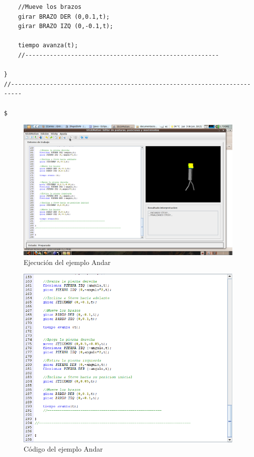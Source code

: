 \documentclass[a4paper, 12pt]{book}
\begin{document}
\begin{itemize}
\begin{verbatim}
    //Mueve los brazos
    girar BRAZO DER (0,0.1,t);
    girar BRAZO IZQ (0,-0.1,t);

    tiempo avanza(t);
    //-------------------------------------------------------

}
//-------------------------------------------------------------------------

$
\end{verbatim}
  
  
  
  
\begin{figure}[htb]
  \centerline{\includegraphics[width=\textwidth]{./imagenes/andar.png}}
  \caption{Ejecución del ejemplo Andar}
\end{figure}


\begin{figure}[htb]
  \centerline{\includegraphics[width=\textwidth]{./imagenes/codigoAndar.png}}
\caption{Código del ejemplo Andar}
\end{figure}



\end{itemize}
\end{document}
